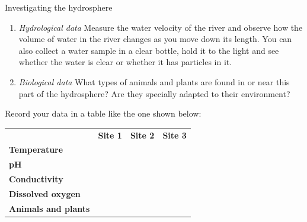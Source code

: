 \begin{Investigation}{Investigating the hydrosphere
      }
\begin{enumerate}[noitemsep, label=\textbf{\arabic*}. ]
\label{m38138*uid7}\item \textsl{Hydrological data}
Measure the water velocity of the river and observe how the volume of water in the river changes as you move down its length. You can also collect a water sample in a clear bottle, hold it to the light and see whether the water is clear or whether it has particles in it.
\label{m38138*uid8}\item \textsl{Biological data}
What types of animals and plants are found in or near this part of the hydrosphere? Are they specially adapted to their environment?
\end{enumerate}

Record your data in a table like the one shown below:
          \begin{table}[H]
        \begin{center}
      \label{m38138*id334712}
    \noindent
      \tablelasttail{}
      \begin{xtabular}[t]{|l|l|l|l|}\hline
         &
        \textbf{Site 1} &
        \textbf{Site 2} &
        \textbf{Site 3}%
     \tabularnewline{}
        \textbf{Temperature} &
         &
         &
     \tabularnewline{}
        \textbf{pH} &
         &
         &
     \tabularnewline{}
        \textbf{Conductivity} &
         &
         &
     \tabularnewline{}
        \textbf{Dissolved oxygen} &
         &
         &
     \tabularnewline{}
        \textbf{Animals and plants} &

\end{xtabular}
\end{center}
\end{table}
\end{Investigation}
